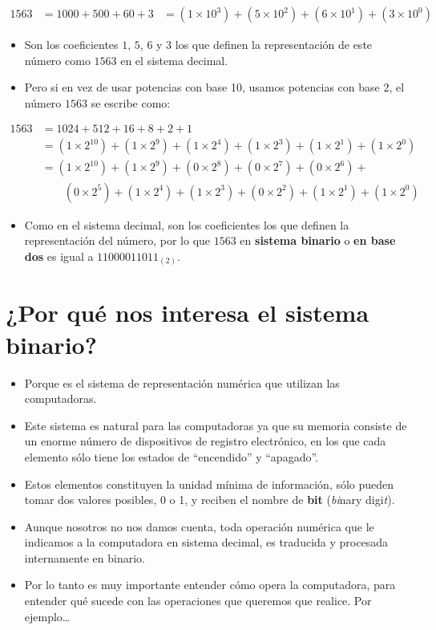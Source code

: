 \documentclass[openany]{book}
\providecommand{\tightlist}{%
  \setlength{\itemsep}{0pt}\setlength{\parskip}{0pt}}
\begin{document}
\[
\begin{aligned}
1563 &= 1000 + 500 + 60 + 3 
     &= (1 \times 10^3) + (5 \times 10^2) + (6 \times 10^1) + (3 \times 10^0)
\end{aligned}
\]

\begin{itemize}
\tightlist
\item
  Son los coeficientes \(1\), \(5\), \(6\) y \(3\) los que definen la representación de este número como \(1563\) en el sistema decimal.
\item
  Pero si en vez de usar potencias con base 10, usamos potencias con base 2, el número \(1563\) se escribe como:
\end{itemize}

\[
\begin{aligned}
1563 & = 1024 + 512 + 16 + 8 + 2 + 1  \\
    &= (1 \times 2^{10}) + (1 \times 2^9) + (1 \times 2^4) + (1 \times 2^3) + (1 \times 2^1) + (1 \times 2^0) \\
    &= (1 \times 2^{10}) + (1 \times 2^9) + (0 \times 2^8) + (0 \times 2^7) + (0 \times 2^6) + \\
&\qquad (0 \times 2^5) + (1 \times 2^4) + (1 \times 2^3) + (0 \times 2^2) + (1 \times 2^1) + (1 \times 2^0)
\end{aligned} 
\]

\begin{itemize}
\tightlist
\item
  Como en el sistema decimal, son los coeficientes los que definen la representación del número, por lo que \(1563\) en \textbf{sistema binario} o \textbf{en base dos} es igual a \(11000011011_{(2)}\).
\end{itemize}

\hypertarget{por-quuxe9-nos-interesa-el-sistema-binario}{%
\section{¿Por qué nos interesa el sistema binario?}\label{por-quuxe9-nos-interesa-el-sistema-binario}}

\begin{itemize}
\tightlist
\item
  Porque es el sistema de representación numérica que utilizan las computadoras.
\item
  Este sistema es natural para las computadoras ya que su memoria consiste de un enorme número de dispositivos de registro electrónico, en los que cada elemento sólo tiene los estados de ``encendido'' y ``apagado''.
\item
  Estos elementos constituyen la unidad mínima de información, sólo pueden tomar dos valores posibles, 0 o 1, y reciben el nombre de \textbf{bit} (\emph{bi}nary digi\emph{t}).
\item
  Aunque nosotros no nos damos cuenta, toda operación numérica que le indicamos a la computadora en sistema decimal, es traducida y procesada internamente en binario.
\item
  Por lo tanto es muy importante entender cómo opera la computadora, para entender qué sucede con las operaciones que queremos que realice. Por ejemplo\ldots{}
\end{itemize}
\end{document}
